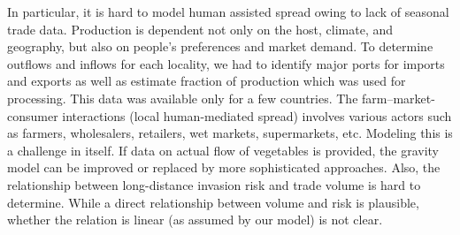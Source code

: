 \documentclass[11pt]{article}
\theoremstyle{definition}
\begin{document}
In particular, it is hard to model human assisted spread owing to lack of
seasonal trade data. Production is dependent not only on the host, climate,
and geography, but also on people's preferences and market demand. To
determine outflows and inflows for each locality, we had to identify major
ports for imports and exports as well as estimate fraction of production
which was used for processing. This data was available only for a few
countries.  The farm--market-consumer interactions (local human-mediated
spread) involves various actors such as farmers, wholesalers, retailers,
wet markets, supermarkets, etc. Modeling this is a challenge in itself. If
data on actual flow of vegetables is provided, the gravity model can be
improved or replaced by more sophisticated approaches. Also, the
relationship between long-distance invasion risk and trade volume is hard
to determine. While a direct relationship between volume and risk is
plausible, whether the relation is linear (as assumed by our model) is not
clear.


\end{document}
